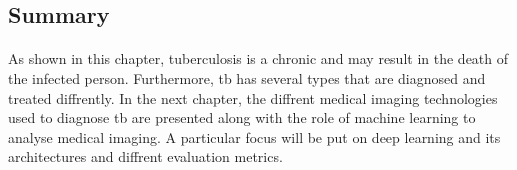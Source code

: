 \subsection{Summary}
\paragraph{}
As shown in this chapter, tuberculosis is a chronic and may result in the death of the infected person. Furthermore, \acs{tb} has several types that are diagnosed and treated diffrently. In the next chapter, the diffrent medical imaging technologies used to diagnose \acs{tb} are presented along with the role of machine learning to analyse medical imaging. A particular focus will be put on deep learning and its architectures and diffrent evaluation metrics.